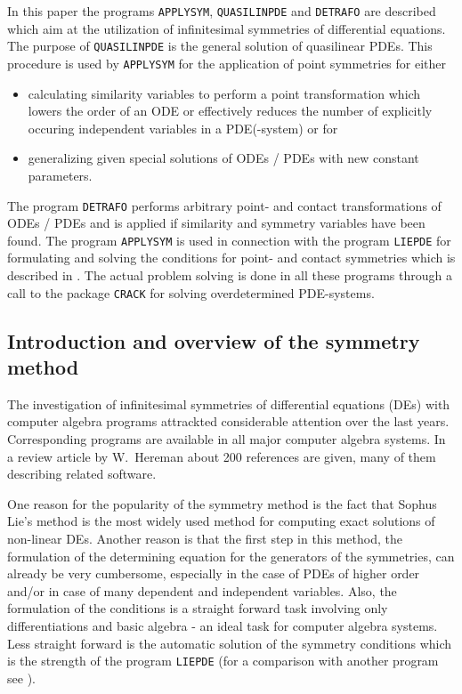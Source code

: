 

In this paper the programs \texttt{APPLYSYM}, \texttt{QUASILINPDE} and
\texttt{DETRAFO} are described which aim at the utilization
of infinitesimal symmetries of differential equations. The purpose
of \texttt{QUASILINPDE} is the general solution of
quasilinear PDEs. This procedure is used by \texttt{APPLYSYM}
for the application of point symmetries for either
\begin{itemize}
\item calculating similarity variables to perform a point transformation
which lowers the order of an ODE or effectively reduces the number of
explicitly occuring independent variables in a PDE(-system) or for
\item generalizing given special solutions of ODEs / PDEs with new constant
parameters.
\end{itemize}

The program \texttt{DETRAFO} performs arbitrary point- and contact
transformations of ODEs / PDEs and is applied if similarity
and symmetry variables have been found.
The program \texttt{APPLYSYM} is used in connection with the program
\texttt{LIEPDE} for formulating and solving the conditions for point- and
contact symmetries which is described in \cite{Wolf:93}.
The actual problem solving is done in all these programs through a call
to the package \texttt{CRACK} for solving overdetermined PDE-systems.

\subsection{Introduction and overview of the symmetry method}
The investigation of infinitesimal symmetries of differential equations
(DEs) with computer algebra programs attrackted considerable attention
over the last years. Corresponding programs are available in all
major computer algebra systems. In a review article by W.\ Hereman
\cite{Hereman:95} about 200 references are given, many of them describing related
software.

One reason for the popularity of the symmetry method
is the fact that Sophus Lie's method
\cite{Lie:1880,Lie:1967} is the most widely
used method for computing exact solutions of non-linear DEs. Another reason is
that the first step in this
method, the formulation of the determining equation for the generators
of the symmetries, can already be very cumbersome, especially in the
case of PDEs of higher order and/or in case of many dependent and independent
variables. Also, the formulation of the conditions is a straight forward
task involving only differentiations and basic algebra - an ideal task for
computer algebra systems. Less straight forward is the automatic solution
of the symmetry conditions which is the strength of the program \texttt{LIEPDE}
(for a comparison with another program see \cite{Wolf:93}).

